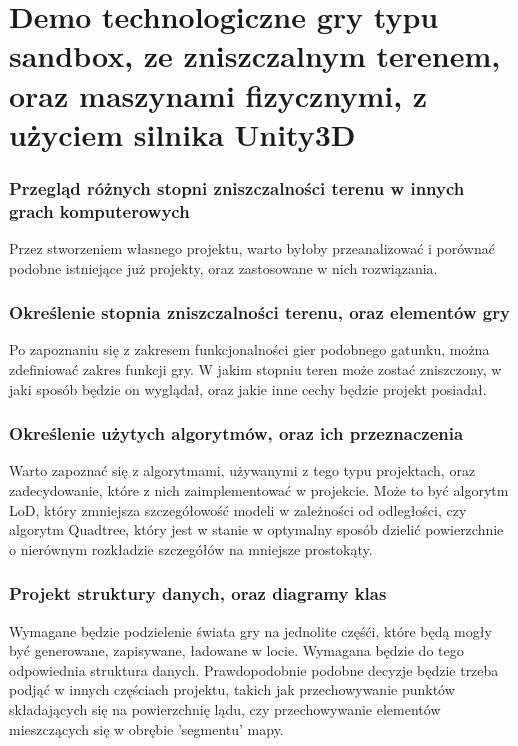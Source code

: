\documentclass[12pt]{article}
\begin{document}
\tabelka


\section*{Demo technologiczne gry typu sandbox, ze zniszczalnym terenem, oraz maszynami fizycznymi, z użyciem silnika Unity3D}

\subsubsection{Przegląd różnych stopni zniszczalności terenu w innych grach komputerowych}
Przez stworzeniem własnego projektu, warto byłoby przeanalizować i porównać podobne istniejące już projekty, oraz zastosowane w nich rozwiązania.
\\
\subsubsection{Określenie stopnia zniszczalności terenu, oraz elementów gry}
Po zapoznaniu się z zakresem funkcjonalności gier podobnego gatunku, można zdefiniować zakres funkcji gry. W jakim stopniu teren może zostać zniszczony, w jaki sposób będzie on wyglądał, oraz jakie inne cechy będzie projekt posiadał.
\\
\subsubsection{Określenie użytych algorytmów, oraz ich przeznaczenia}
Warto zapoznać się z algorytmami, używanymi z tego typu projektach, oraz zadecydowanie, które z nich zaimplementować w projekcie. Może to być algorytm LoD, który zmniejsza szczegółowość modeli w zależności od odległości, czy algorytm Quadtree, który jest w stanie w optymalny sposób dzielić powierzchnie o nierównym rozkładzie szczegółów na mniejsze prostokąty.
\\
\subsubsection{Projekt struktury danych, oraz diagramy klas}
Wymagane będzie podzielenie świata gry na jednolite częśći, które będą mogły być generowane, zapisywane, ładowane w locie. Wymagana będzie do tego odpowiednia struktura danych. Prawdopodobnie podobne decyzje będzie trzeba podjąć w innych częściach projektu, takich jak przechowywanie punktów składających się na powierzchnię lądu, czy przechowywanie elementów mieszczących się w obrębie 'segmentu' mapy.
\\
\end{document}
